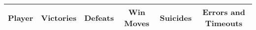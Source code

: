 \documentclass[pdftex,...]{article}%
\newcommand{\onegame}[1]{
    \begin{tabular}{c}
    #1 \\
    \begin{tabular}{cc}
        \texttt{[image: \#1]} &
        \begin{tabular}[b]{ccccc}
            Turn & Player & Move & Judge & Time\\
            \hline
            
            \hline
        \end{tabular}
    \end{tabular}
    \end{tabular}
}
\begin{document}
%        
\begin{tabular}[b]{c|cc|ccc}
    Player & Victories & Defeats & Win Moves & Suicides & Errors and Timeouts \\
    \hline
    
    \hline
\end{tabular}


\end{document}
